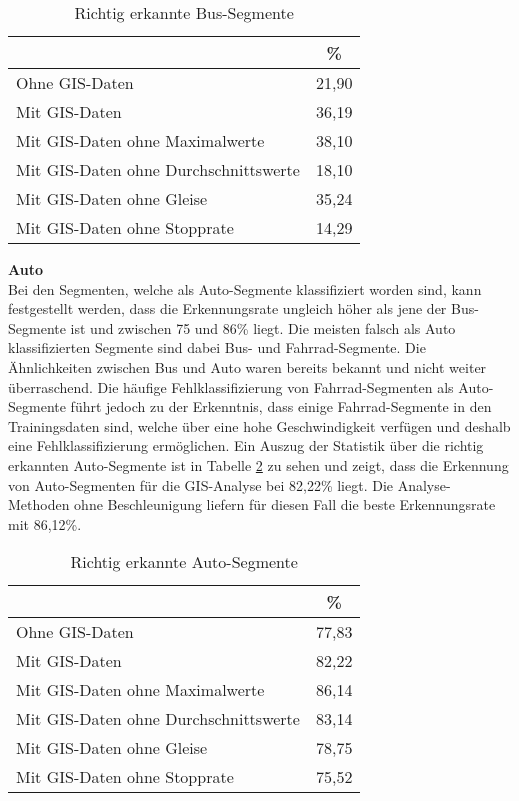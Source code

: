 \begin{table}[h]
\centering
\begin{tabular}{|l|c|}
\hline
 & \% \\ \hline
Ohne GIS-Daten & 21,90 \\ \hline
Mit GIS-Daten & 36,19 \\ \hline
Mit GIS-Daten ohne Maximalwerte & 38,10 \\ \hline
Mit GIS-Daten ohne Durchschnittswerte & 18,10 \\ \hline
Mit GIS-Daten ohne Gleise & 35,24 \\ \hline
Mit GIS-Daten ohne Stopprate & 14,29 \\ \hline
\end{tabular}
\caption{Richtig erkannte Bus-Segmente}
\label{result-bus}
\end{table}

\textbf{Auto} \\
Bei den Segmenten, welche als Auto-Segmente klassifiziert worden sind, kann festgestellt werden, dass die Erkennungsrate ungleich höher als jene der Bus-Segmente ist und zwischen 75 und 86\% liegt. Die meisten falsch als Auto klassifizierten Segmente sind dabei Bus- und Fahrrad-Segmente. Die Ähnlichkeiten zwischen Bus und Auto waren bereits bekannt und nicht weiter überraschend. Die häufige Fehlklassifizierung von Fahrrad-Segmenten als Auto-Segmente führt jedoch zu der Erkenntnis, dass einige Fahrrad-Segmente in den Trainingsdaten sind, welche über eine hohe Geschwindigkeit verfügen und deshalb eine Fehlklassifizierung ermöglichen. Ein Auszug der Statistik über die richtig erkannten Auto-Segmente ist in Tabelle \ref{result-drive} zu sehen und zeigt, dass die Erkennung von Auto-Segmenten für die GIS-Analyse bei 82,22\% liegt. Die Analyse-Methoden ohne Beschleunigung liefern für diesen Fall die beste Erkennungsrate mit 86,12\%.

\begin{table}[h]
\centering
\begin{tabular}{|l|c|}
\hline
 & \% \\ \hline
Ohne GIS-Daten & 77,83 \\ \hline
Mit GIS-Daten & 82,22 \\ \hline
Mit GIS-Daten ohne Maximalwerte & 86,14 \\ \hline
Mit GIS-Daten ohne Durchschnittswerte & 83,14 \\ \hline
Mit GIS-Daten ohne Gleise & 78,75 \\ \hline
Mit GIS-Daten ohne Stopprate & 75,52 \\ \hline
\end{tabular}
\caption{Richtig erkannte Auto-Segmente}
\label{result-drive}
\end{table}

